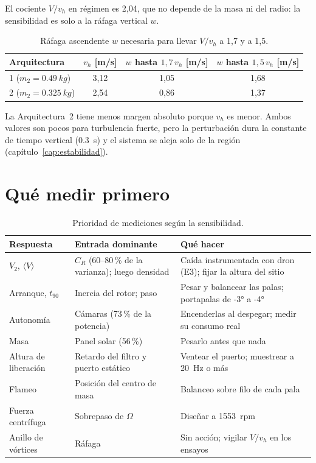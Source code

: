 El cociente $V/v_h$ en régimen es 2,04, que no depende de la masa ni del radio: la
sensibilidad es solo a la ráfaga vertical $w$.
\begin{table}[H]
\centering\small
\caption{Ráfaga ascendente $w$ necesaria para llevar $V/v_h$ a 1,7 y a 1,5.}\label{tab:sens-gust}
\begin{tabular}{@{}lccc@{}}
\toprule
\textbf{Arquitectura} & $v_h$ [m/s] & $w$ hasta $1{,}7\,v_h$ [m/s] & $w$ hasta $1{,}5\,v_h$ [m/s]\\\midrule
1 ($m_2=\SI{0.49}{kg}$) & 3,12 & 1,05 & 1,68\\
2 ($m_2=\SI{0.325}{kg}$) & 2,54 & 0,86 & 1,37\\
\bottomrule
\end{tabular}
\end{table}
La Arquitectura~2 tiene menos margen absoluto porque $v_h$ es menor. Ambos valores son
pocos para turbulencia fuerte, pero la perturbación dura la constante de tiempo vertical
(\SI{0.3}{s}) y el sistema se aleja solo de la región (capítulo~\ref{cap:estabilidad}).

\section{Qué medir primero}\label{sec:sens-prioridad}

\begin{table}[H]
\centering\small
\caption{Prioridad de mediciones según la sensibilidad.}\label{tab:sens-prioridad}
\begin{tabularx}{\textwidth}{@{}lYY@{}}
\toprule
\textbf{Respuesta} & \textbf{Entrada dominante} & \textbf{Qué hacer}\\\midrule
$V_2$, $\langle V\rangle$ & $C_R$ (60--80\,\% de la varianza); luego densidad & Caída instrumentada con dron (E3); fijar la altura del sitio\\
Arranque, $t_{90}$ & Inercia del rotor; paso & Pesar y balancear las palas; portapalas de \ang{-3} a \ang{-4}\\
Autonomía & Cámaras (73\,\% de la potencia) & Encenderlas al despegar; medir su consumo real\\
Masa & Panel solar (56\,\%) & Pesarlo antes que nada\\
Altura de liberación & Retardo del filtro y puerto estático & Ventear el puerto; muestrear a \SI{20}{Hz} o más\\
Flameo & Posición del centro de masa & Balanceo sobre filo de cada pala\\
Fuerza centrífuga & Sobrepaso de $\Omega$ & Diseñar a \num{1553}~rpm\\
Anillo de vórtices & Ráfaga & Sin acción; vigilar $V/v_h$ en los ensayos\\
\bottomrule
\end{tabularx}
\end{table}
